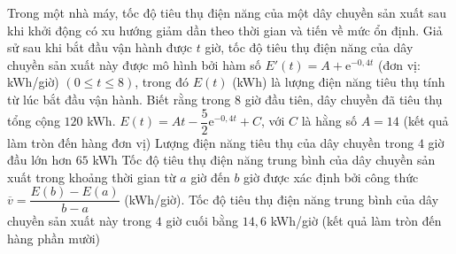 \begin{ex}%
	Trong một nhà máy, tốc độ tiêu thụ điện năng của một dây chuyền sản xuất sau khi khởi động có xu hướng giảm dần theo thời gian và tiến về mức ổn định. Giả sử sau khi bắt đầu vận hành được $t$ giờ, tốc độ tiêu thụ điện năng của dây chuyền sản xuất này được mô hình bởi hàm số $E'(t) = A + \mathrm{e}^{-0{,}4t}$ (đơn vị: kWh/giờ) $\left( 0 \le t \le 8 \right)$, trong đó $E(t)$ (kWh) là lượng điện năng tiêu thụ tính từ lúc bắt đầu vận hành. Biết rằng trong $8$ giờ đầu tiên, dây chuyền đã tiêu thụ tổng cộng $120$ kWh.
	\choiceTF
	{\True $E(t) = At - \dfrac{5}{2}\mathrm{e}^{-0{,}4t} + C$, với $C$ là hằng số}
	{$A = 14$ (kết quả làm tròn đến hàng đơn vị)}
	{Lượng điện năng tiêu thụ của dây chuyền trong $4$ giờ đầu lớn hơn $65$ kWh}
	{Tốc độ tiêu thụ điện năng trung bình của dây chuyền sản xuất trong khoảng thời gian từ $a$ giờ đến $b$ giờ được xác định bởi công thức $\overline{v} = \dfrac{E(b) - E(a)}{b - a}$ (kWh/giờ). Tốc độ tiêu thụ điện năng trung bình của dây chuyền sản xuất này trong $4$ giờ cuối bằng $14{,}6$ kWh/giờ (kết quả làm tròn đến hàng phần mười)}
\end{ex}

